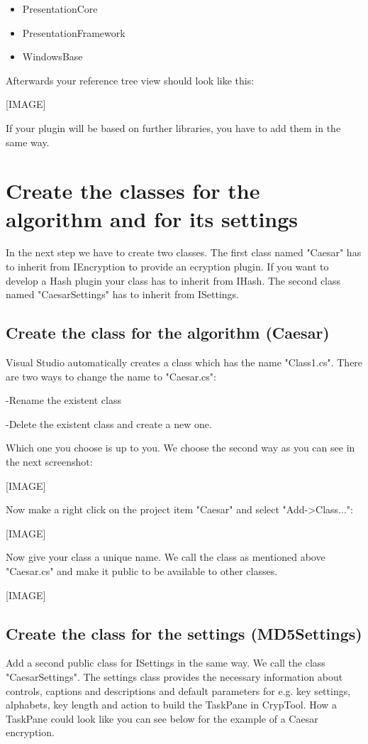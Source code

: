 \begin{itemize}
    \item PresentationCore
    \item PresentationFramework
    \item WindowsBase
\end{itemize}

Afterwards your reference tree view should look like this:

[IMAGE]

If your plugin will be based on further libraries, you have to add them in the same way.


\section{Create the classes for the algorithm and for its settings}\label{sec:CreateTheClassesForTheAlgorithmAndForItsSettings}
In the next step we have to create two classes. The first class named "Caesar" has to inherit from IEncryption to provide an ecryption plugin. If you want to develop a Hash plugin your class has to inherit from IHash.
The second class named "CaesarSettings" has to inherit from ISettings.
\subsection{Create the class for the algorithm (Caesar)}\label{sec:CreateTheClassForTheAlgorithmCaesar}
Visual Studio automatically creates a class which has the name "Class1.cs".  There are two ways to change the name to "Caesar.cs":

\hspace{20pt}-Rename the existent class

\hspace{20pt}-Delete the existent class and create a new one.

Which one you choose is up to you. We choose the second way as you can see in the next screenshot:

[IMAGE]

Now make a right click on the project item "Caesar" and select "Add->Class...":

[IMAGE]

Now give your class a unique name. We call the class as mentioned above "Caesar.cs" and make it public to be available to other classes.

[IMAGE]

\subsection{Create the class for the settings (MD5Settings)}\label{sec:CreateTheClassForTheSettingsCaesarSettings}
Add a second public class for ISettings in the same way. We call the class "CaesarSettings". The settings class provides the necessary information about controls, captions and descriptions and default parameters for e.g. key settings, alphabets, key length and action to build the TaskPane in CrypTool. How a TaskPane could look like you can see below for the example of a Caesar encryption.

